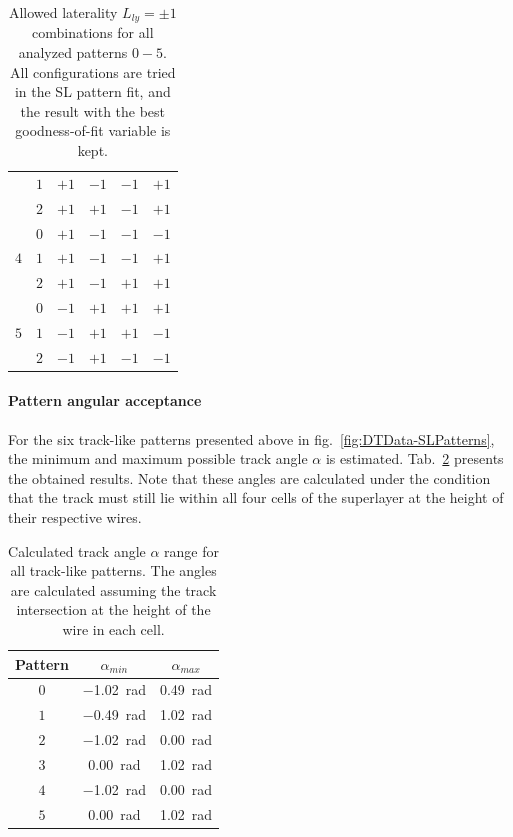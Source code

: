\begin{table}[htb]
\begin{tabular}{|c|c|c|c|c|c|}
                             & $1$ & $+1$ & $-1$ & $-1$ & $+1$ \\
                             & $2$ & $+1$ & $+1$ & $-1$ & $+1$ \\ \hline
        \multirow{3}{*}{$4$} & $0$ & $+1$ & $-1$ & $-1$ & $-1$ \\
                             & $1$ & $+1$ & $-1$ & $-1$ & $+1$ \\
                             & $2$ & $+1$ & $-1$ & $+1$ & $+1$ \\ \hline
        \multirow{3}{*}{$5$} & $0$ & $-1$ & $+1$ & $+1$ & $+1$ \\
                             & $1$ & $-1$ & $+1$ & $+1$ & $-1$ \\
                             & $2$ & $-1$ & $+1$ & $-1$ & $-1$ \\ \hline
    \end{tabular}
    \caption{Allowed laterality $L_{ly}=\pm 1$ combinations for all analyzed patterns $0-5$. All configurations are tried in the \ac{SL} pattern fit, and the result with the best goodness-of-fit variable is kept.}
    \label{tab:DTData-SLPatternFit-AllowedLateralities}
\end{table}

\FloatBarrier
\paragraph{Pattern angular acceptance}
For the six track-like patterns presented above in fig.\ \ref{fig:DTData-SLPatterns}, the minimum and maximum possible track angle $\alpha$ is estimated. Tab.\ \ref{tab:SLPatternFit-AngularRange} presents the obtained results. Note that these angles are calculated under the condition that the track must still lie within all four cells of the superlayer at the height of their respective wires.
\begin{table}[htb]
    \centering
    \begin{tabular}{|c|c|c|} 
        \hline
        Pattern & $\alpha_{min}$ & $\alpha_{max}$ \\ \hline
        $0$ & \SI{-1.02}{\radian} & \SI{0.49}{\radian} \\
        $1$ & \SI{-0.49}{\radian} & \SI{1.02}{\radian} \\
        $2$ & \SI{-1.02}{\radian} & \SI{0.00}{\radian} \\
        $3$ & \SI{0.00}{\radian} & \SI{1.02}{\radian} \\
        $4$ & \SI{-1.02}{\radian} & \SI{0.00}{\radian} \\
        $5$ & \SI{0.00}{\radian} & \SI{1.02}{\radian} \\ \hline
    \end{tabular}
    \caption{Calculated track angle $\alpha$ range for all track-like patterns. The angles are calculated assuming the track intersection at the height of the wire in each cell.}
    \label{tab:SLPatternFit-AngularRange}
\end{table}


